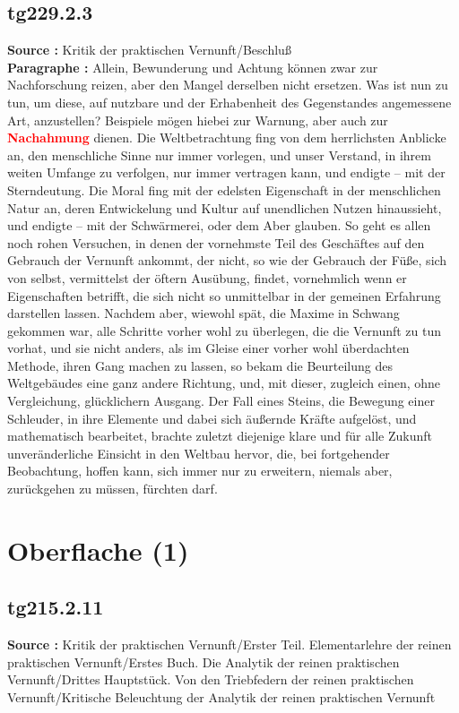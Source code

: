\documentclass[a4paper,12pt,twoside]{book}
\newcommand{\match}[1]{\textcolor{red}{\textbf{#1}}}
\newcommand{\unnumberedsection}[1]{
	\section*{#1}
	\addcontentsline{toc}{section}{#1}
	\markright{#1}
}
\begin{document}
	\subsection*{tg229.2.3} 
	\textbf{Source : }Kritik der praktischen Vernunft/Beschluß\\  
	
	\noindent\textbf{Paragraphe : }Allein, Bewunderung und Achtung können zwar zur Nachforschung reizen, aber den Mangel derselben nicht ersetzen.  Was ist nun zu tun, um diese, auf nutzbare und der Erhabenheit des Gegenstandes angemessene Art, anzustellen? Beispiele mögen hiebei zur Warnung, aber auch zur \match{Nachahmung} dienen. Die Weltbetrachtung fing von dem herrlichsten Anblicke an, den menschliche Sinne nur immer vorlegen, und unser Verstand, in ihrem weiten Umfange zu verfolgen, nur immer vertragen kann, und endigte – mit der Sterndeutung. Die Moral fing mit der edelsten Eigenschaft in der menschlichen Natur an, deren Entwickelung und Kultur auf unendlichen Nutzen hinaussieht, und endigte – mit der Schwärmerei, oder dem Aber glauben. So geht es allen noch rohen Versuchen, in denen der vornehmste Teil des Geschäftes auf den Gebrauch der Vernunft ankommt, der nicht, so wie der Gebrauch der Füße, sich von selbst, vermittelst der öftern Ausübung, findet, vornehmlich wenn er Eigenschaften betrifft, die sich nicht so unmittelbar in der gemeinen Erfahrung darstellen lassen. Nachdem aber, wiewohl spät, die Maxime in Schwang gekommen war, alle Schritte vorher wohl zu überlegen, die die Vernunft zu tun vorhat, und sie nicht anders, als im Gleise einer vorher wohl überdachten Methode, ihren Gang machen zu lassen, so bekam die Beurteilung des Weltgebäudes eine ganz andere Richtung, und, mit dieser, zugleich einen, ohne Vergleichung, glücklichern Ausgang. Der Fall eines Steins, die Bewegung einer Schleuder, in ihre Elemente und dabei sich äußernde Kräfte aufgelöst, und mathematisch bearbeitet, brachte zuletzt diejenige klare und für alle Zukunft unveränderliche Einsicht in den Weltbau hervor, die, bei fortgehender Beobachtung, hoffen kann, sich immer nur zu erweitern, niemals aber, zurückgehen zu müssen, fürchten darf. 
	
	\unnumberedsection{Oberflache (1)} 
	\subsection*{tg215.2.11} 
	\textbf{Source : }Kritik der praktischen Vernunft/Erster Teil. Elementarlehre der reinen praktischen Vernunft/Erstes Buch. Die Analytik der reinen praktischen Vernunft/Drittes Hauptstück. Von den Triebfedern der reinen praktischen Vernunft/Kritische Beleuchtung der Analytik der reinen praktischen Vernunft\\  
	
\end{document}
